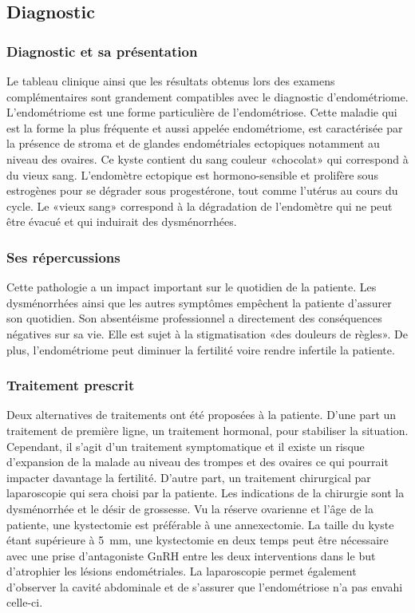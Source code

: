 \subsection{Diagnostic}

\subsubsection{Diagnostic et sa présentation}
Le tableau clinique ainsi que les résultats obtenus lors des examens complémentaires sont grandement compatibles avec le diagnostic d’endométriome. L’endométriome est une forme particulière de l’endométriose. Cette maladie qui est la forme la plus fréquente et aussi appelée endométriome, est caractérisée par la présence de stroma et de glandes endométriales ectopiques notamment au niveau des ovaires. Ce kyste contient du sang couleur «chocolat» qui correspond à du vieux sang. L’endomètre ectopique est hormono-sensible et prolifère sous estrogènes pour se dégrader sous progestérone, tout comme l’utérus au cours du cycle. Le «vieux sang» correspond à la dégradation de l’endomètre qui ne peut être évacué et qui induirait des dysménorrhées.

\subsubsection{Ses répercussions}
Cette pathologie a un impact important sur le quotidien de la patiente. Les dysménorrhées ainsi que les autres symptômes empêchent la patiente d’assurer son quotidien. Son absentéisme professionnel a directement des conséquences négatives sur sa vie. Elle est sujet à la stigmatisation «des douleurs de règles». De plus, l’endométriome peut diminuer la fertilité voire rendre infertile la patiente.

\subsubsection{Traitement prescrit}
Deux alternatives de traitements ont été proposées à la patiente. D’une part un traitement de première ligne, un traitement hormonal, pour stabiliser la situation. Cependant, il s’agit d’un traitement symptomatique et il existe un risque d’expansion de la malade au niveau des trompes et des ovaires ce qui pourrait impacter davantage la fertilité. D’autre part, un traitement chirurgical par laparoscopie qui sera choisi par la patiente. Les indications de la chirurgie sont la dysménorrhée et le désir de grossesse. Vu la réserve ovarienne et l’âge de la patiente, une kystectomie est préférable à une annexectomie. La taille du kyste étant supérieure à \qty{5}{\mm}, une kystectomie en deux temps peut être nécessaire avec une prise d’antagoniste GnRH entre les deux interventions dans le but d’atrophier les lésions endométriales. La laparoscopie permet également d’observer la cavité abdominale et de s’assurer que l’endométriose n’a pas envahi celle-ci.